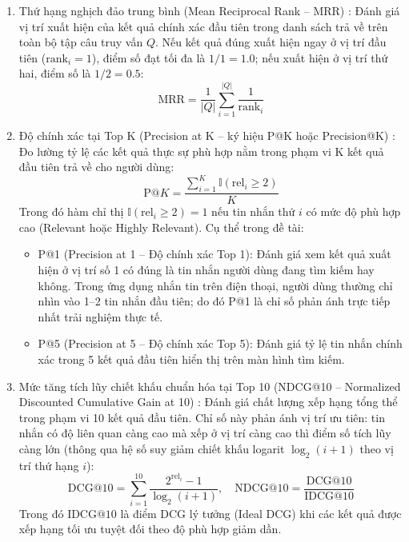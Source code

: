 \documentclass[12pt,a4paper,oneside]{report}
\begin{document}
\begin{enumerate}
    \item Thứ hạng nghịch đảo trung bình (Mean Reciprocal Rank -- MRR) \cite{ref1}: Đánh giá vị trí xuất hiện của kết quả chính xác đầu tiên trong danh sách trả về trên toàn bộ tập câu truy vấn $Q$. Nếu kết quả đúng xuất hiện ngay ở vị trí đầu tiên ($\text{rank}_i = 1$), điểm số đạt tối đa là $1/1 = 1.0$; nếu xuất hiện ở vị trí thứ hai, điểm số là $1/2 = 0.5$:
    \begin{equation}
    \text{MRR} = \frac{1}{|Q|} \sum_{i=1}^{|Q|} \frac{1}{\text{rank}_i}
    \end{equation}
    
    \item Độ chính xác tại Top K (Precision at K -- ký hiệu P@K hoặc Precision@K) \cite{ref1}: Đo lường tỷ lệ các kết quả thực sự phù hợp nằm trong phạm vi K kết quả đầu tiên trả về cho người dùng:
    \begin{equation}
    \text{P@}K = \frac{\sum_{i=1}^{K} \mathbb{I}(\text{rel}_i \ge 2)}{K}
    \end{equation}
    Trong đó hàm chỉ thị $\mathbb{I}(\text{rel}_i \ge 2) = 1$ nếu tin nhắn thứ $i$ có mức độ phù hợp cao (Relevant hoặc Highly Relevant). Cụ thể trong đề tài:
    \begin{itemize}
        \item P@1 (Precision at 1 -- Độ chính xác Top 1): Đánh giá xem kết quả xuất hiện ở vị trí số 1 có đúng là tin nhắn người dùng đang tìm kiếm hay không. Trong ứng dụng nhắn tin trên điện thoại, người dùng thường chỉ nhìn vào 1--2 tin nhắn đầu tiên; do đó P@1 là chỉ số phản ánh trực tiếp nhất trải nghiệm thực tế.
        \item P@5 (Precision at 5 -- Độ chính xác Top 5): Đánh giá tỷ lệ tin nhắn chính xác trong 5 kết quả đầu tiên hiển thị trên màn hình tìm kiếm.
    \end{itemize}
    
    \item Mức tăng tích lũy chiết khấu chuẩn hóa tại Top 10 (NDCG@10 -- Normalized Discounted Cumulative Gain at 10) \cite{ref1}: Đánh giá chất lượng xếp hạng tổng thể trong phạm vi 10 kết quả đầu tiên. Chỉ số này phản ánh vị trí ưu tiên: tin nhắn có độ liên quan càng cao mà xếp ở vị trí càng cao thì điểm số tích lũy càng lớn (thông qua hệ số suy giảm chiết khấu logarit $\log_2(i + 1)$ theo vị trí thứ hạng $i$):
    \begin{equation}
    \text{DCG@10} = \sum_{i=1}^{10} \frac{2^{\text{rel}_i} - 1}{\log_2(i + 1)}, \quad \text{NDCG@10} = \frac{\text{DCG@10}}{\text{IDCG@10}}
    \end{equation}
    Trong đó $\text{IDCG@10}$ là điểm DCG lý tưởng (Ideal DCG) khi các kết quả được xếp hạng tối ưu tuyệt đối theo độ phù hợp giảm dần.
\end{enumerate}
\end{document}
